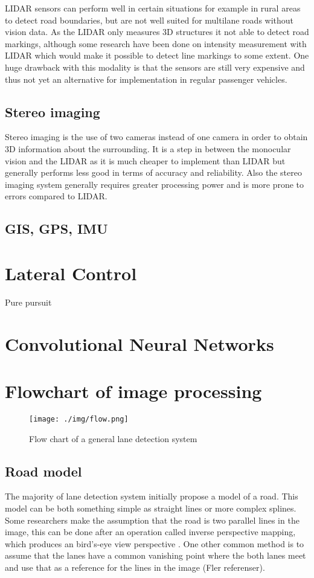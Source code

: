 LIDAR sensors can perform well in certain situations for example in rural areas to detect road boundaries, \cite{BarHillel2014} but are not well suited for multilane roads without vision data. As the LIDAR only measures 3D structures it not able to detect road markings, although some research have been done on intensity measurement with LIDAR \cite{huang2009finding} \cite{kammel2008lidar} which would make it possible to detect line markings to some extent. One huge drawback with this modality is that the sensors are still very expensive and thus not yet an alternative for implementation in regular passenger vehicles.

\subsection{Stereo imaging}
Stereo imaging is the use of two cameras instead of one camera in order to obtain 3D information about the surrounding. It is a step in between the monocular vision and the LIDAR as it is much cheaper to implement than LIDAR but generally performs less good in terms of accuracy and reliability.  Also the stereo imaging system generally requires greater processing power and is more prone to errors compared to LIDAR. 


\subsection{GIS, GPS, IMU}



\section{Lateral Control}
Pure pursuit
\section{Convolutional Neural Networks}


\section{Flowchart of image processing}

\begin{figure}[H]
  \texttt{[image: ./img/flow.png]}
  \centering
  \caption{Flow chart of a general lane detection system}
  \label{fig:Software architecture of the EMC2 platform}
\end{figure}


\subsection{Road model}
The majority of lane detection system initially propose a model of a road. This model can be both something simple as straight lines or more complex splines. Some researchers make the assumption that the road is two parallel lines in the image, this can be done after an operation called inverse perspective mapping, which produces an bird's-eye view  perspective \cite{bertozzi1998gold}. One other common method is to assume that the lanes have a common vanishing point where the both lanes meet and use that as a reference for the lines in the image \cite{Yenikaya:2013:KVR:2522968.2522970}(Fler referenser).
